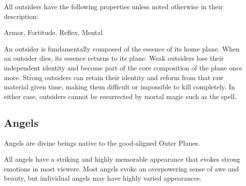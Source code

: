         All outsiders have the following properties unless noted otherwise in their description:
        
    
     Armor,
     Fortitude,
     Reflex,
     Mental
  
     An outsider is fundamentally composed of the essence of its home plane.
    When an outsider dies, its essence returns to its plane.
    Weak outsiders lose their independent identity and become part of the core composition of the plane once more.
    Strong outsiders can retain their identity and reform from that raw material given time, making them difficult or impossible to kill completely.
    In either case, outsiders cannot be resurrected by mortal magic such as the  spell.
  
      
    \subsection{Angels}
      
      Angels are divine beings native to the good-aligned Outer Planes.
    
      All angels have a striking and highly memorable appearance that evokes strong emotions in most viewers.
      Most angels evoke an overpowering sense of awe and beauty, but individual angels may have highly varied appearances.
    

